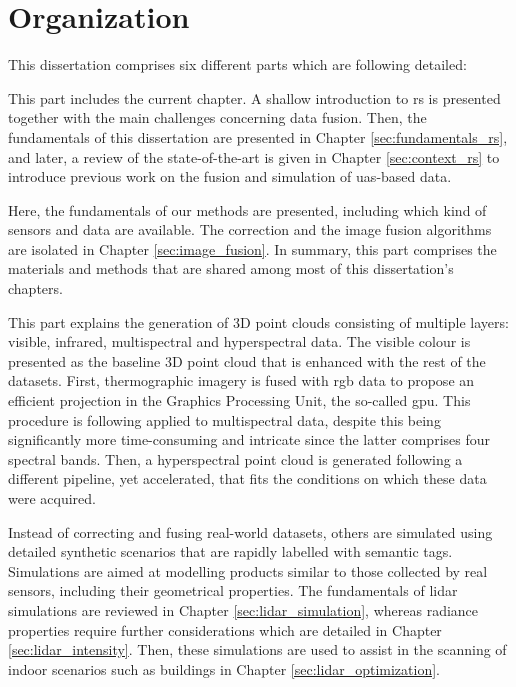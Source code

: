 \section{Organization}

This dissertation comprises six different parts which are following detailed:

\newcommand{\partTabSize}{3mm}

\small \noindent \textbf{} \normalsize\hspace{\partTabSize} This part includes the current chapter. A shallow introduction to \acrshort{rs} is presented together with the main challenges concerning data fusion. Then, the fundamentals of this dissertation are presented in Chapter \ref{sec:fundamentals_rs}, and later, a review of the state-of-the-art is given in Chapter \ref{sec:context_rs} to introduce previous work on the fusion and simulation of \acrshort{uas}-based data.

\small \noindent \textbf{} \normalsize\hspace{\partTabSize} Here, the fundamentals of our methods are presented, including which kind of sensors and data are available. The correction and the image fusion algorithms are isolated in Chapter \ref{sec:image_fusion}. In summary, this part comprises the materials and methods that are shared among most of this dissertation's chapters.

\small \noindent \textbf{} \normalsize\hspace{\partTabSize} This part explains the generation of 3D point clouds consisting of multiple layers: visible, infrared, multispectral and hyperspectral data. The visible colour is presented as the baseline 3D point cloud that is enhanced with the rest of the datasets. First, thermographic imagery is fused with \acrshort{rgb} data to propose an efficient projection in the Graphics Processing Unit, the so-called \acrshort{gpu}. This procedure is following applied to multispectral data, despite this being significantly more time-consuming and intricate since the latter comprises four spectral bands. Then, a hyperspectral point cloud is generated following a different pipeline, yet accelerated, that fits the conditions on which these data were acquired.  

\small \noindent \textbf{} \normalsize\hspace{\partTabSize} Instead of correcting and fusing real-world datasets, others are simulated using detailed synthetic scenarios that are rapidly labelled with semantic tags. Simulations are aimed at modelling products similar to those collected by real sensors, including their geometrical properties. The fundamentals of \acrshort{lidar} simulations are reviewed in Chapter \ref{sec:lidar_simulation}, whereas radiance properties require further considerations which are detailed in Chapter \ref{sec:lidar_intensity}. Then, these simulations are used to assist in the scanning of indoor scenarios such as buildings in Chapter \ref{sec:lidar_optimization}.


